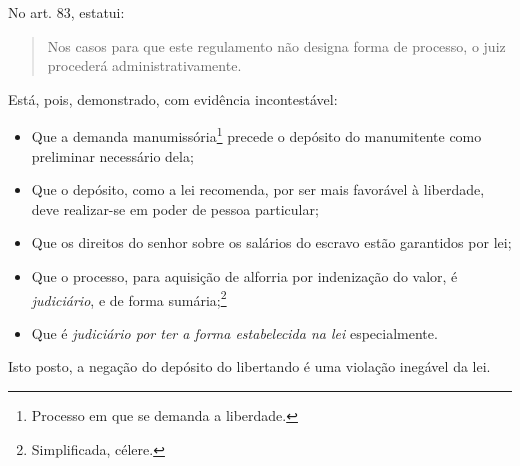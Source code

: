 No art. 83, estatui:

\begin{quote}
Nos casos para que este regulamento não designa forma de processo, o
juiz procederá administrativamente.
\end{quote}

Está, pois, demonstrado, com evidência incontestável:

\begin{itemize}
\item Que a demanda
manumissória\footnote{Processo em que se demanda a liberdade.} precede
o depósito do manumitente como preliminar necessário dela;

\item Que o depósito, como a lei recomenda, por ser mais favorável à
liberdade, deve realizar-se em poder de pessoa particular;

\item Que os direitos do senhor sobre os salários do escravo estão garantidos
por lei;

\item Que o processo, para aquisição de alforria por indenização do valor, é
\emph{judiciário}, e de forma sumária;\footnote{Simplificada, célere.}

\item Que é \emph{judiciário por ter a forma estabelecida na lei}
especialmente.

\end{itemize}
Isto posto, a negação do depósito do libertando é uma violação inegável da lei.

